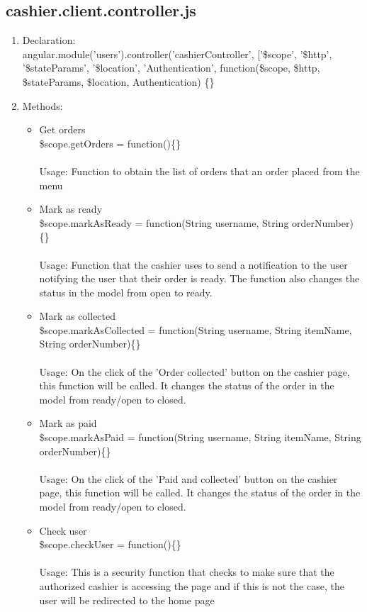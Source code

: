 \documentclass[a4paper,12pt]{article}
\begin{document}
\subsection{cashier.client.controller.js}
\begin{enumerate}
\item Declaration: \\ angular.module('users').controller('cashierController', ['\$scope', '\$http', '\$stateParams', '\$location', 'Authentication',
	function(\$scope, \$http, \$stateParams, \$location, Authentication) \{\}
\item Methods:
	\begin{itemize}
		\item Get orders \\ \$scope.getOrders = function()\{\}
		\\ \\ Usage: Function to obtain the list of orders that an order placed from the menu
		\item Mark as ready \\ \$scope.markAsReady = function(String username, String orderNumber)\{\}
		\\ \\ Usage: Function that the cashier uses to send a notification to the user notifying the user that their order is ready. The function also changes the status in the model from open to ready.
	\item Mark as collected \\ \$scope.markAsCollected = function(String username, String itemName, String orderNumber)\{\}
	\\ \\ Usage: On the click of the 'Order collected' button on the cashier page, this function will be called. It changes the status of the order in the model from ready/open to closed.
	\item Mark as paid \\ \$scope.markAsPaid = function(String username, String itemName, String orderNumber)\{\}
	\\ \\ Usage: On the click of the 'Paid and collected' button on the cashier page, this function will be called. It changes the status of the order in the model from ready/open to closed.
	\item Check user \\ \$scope.checkUser = function()\{\}
	\\ \\ Usage: This is a security function that checks to make sure that the authorized cashier is accessing the page and if this is not the case, the user will be redirected to the home page
	\end{itemize}	
\end{enumerate}
\end{document}
